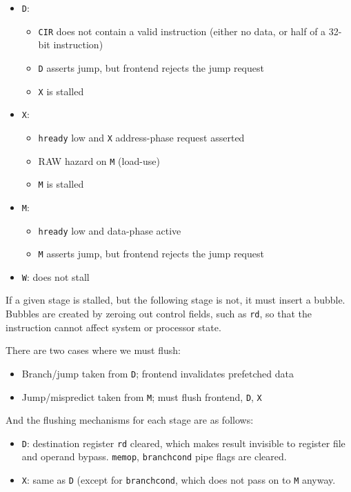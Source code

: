 \begin{itemize}
	\item {\tt D}:
	\begin{itemize}
		\item {\tt CIR} does not contain a valid instruction (either no data, or half of a 32-bit instruction)
		\item {\tt D} asserts jump, but frontend rejects the jump request
		\item {\tt X} is stalled
	\end{itemize}
	\item {\tt X}:
	\begin{itemize}
		\item {\tt hready} low and {\tt X} address-phase request asserted
		\item RAW hazard on {\tt M} (load-use)
		\item {\tt M} is stalled
	\end{itemize}
	\item {\tt M}:
	\begin{itemize}
		\item {\tt hready} low and data-phase active
		\item {\tt M} asserts jump, but frontend rejects the jump request
	\end{itemize}
	\item {\tt W}: does not stall
\end{itemize}

If a given stage is stalled, but the following stage is not, it must insert a bubble. Bubbles are created by zeroing out control fields, such as {\tt rd}, so that the instruction cannot affect system or processor state.

There are two cases where we must flush:

\begin{itemize}
	\item Branch/jump taken from {\tt D}; frontend invalidates prefetched data
	\item Jump/mispredict taken from {\tt M}; must flush frontend, {\tt D}, {\tt X}
\end{itemize}

And the flushing mechanisms for each stage are as follows:
\begin{itemize}
	\item {\tt D}: destination register {\tt rd} cleared, which makes result invisible to register file and operand bypass. {\tt memop}, {\tt branchcond} pipe flags are cleared.
	\item {\tt X}: same as {\tt D} (except for {\tt branchcond}, which does not pass on to {\tt M} anyway.
\end{itemize}

